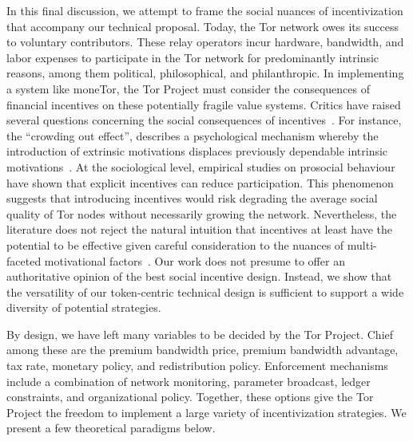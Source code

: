 In this final discussion, we attempt to frame the social nuances of incentivization that accompany our technical proposal.
Today, the Tor network owes its success to voluntary contributors.
These relay operators incur hardware, bandwidth, and labor expenses to participate in the Tor network for predominantly intrinsic reasons, among them political, philosophical, and philanthropic.
In implementing a system like moneTor, the Tor Project must consider the consequences of financial incentives on these potentially fragile value systems.
Critics have raised several questions concerning the social consequences of incentives~\cite{jansenblogpost}.
For instance, the ``crowding out effect'', describes a psychological mechanism whereby the introduction of extrinsic motivations displaces previously dependable intrinsic motivations~\cite{10.1257/jep.25.4.191}.
At the sociological level, empirical studies on prosocial behaviour~\cite{10.1257/aer.96.5.1652} have shown that explicit incentives can reduce participation.
This phenomenon suggests that introducing incentives would risk degrading the average social quality of Tor nodes without necessarily growing the network.
Nevertheless, the literature does not reject the natural intuition that incentives at least have the potential to be effective given careful consideration to the nuances of multi-faceted motivational factors~\cite{10.1257/aer.96.5.1652}.
Our work does not presume to offer an authoritative opinion of the best social incentive design.
Instead, we show that the versatility of our token-centric technical design is sufficient to support a wide diversity of potential strategies.

By design, we have left many variables to be decided by the Tor Project.
Chief among these are the premium bandwidth price, premium bandwidth advantage, tax rate, monetary policy, and redistribution policy.
Enforcement mechanisms include a combination of network monitoring, parameter broadcast, ledger constraints, and organizational policy.
Together, these options give the Tor Project the freedom to implement a large variety of incentivization strategies.
We present a few theoretical paradigms below.

